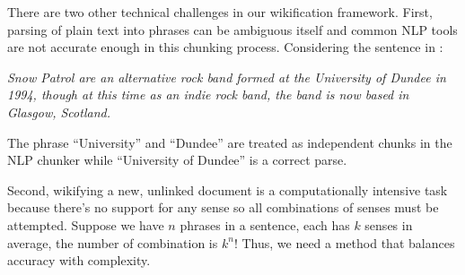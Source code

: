 There are two other technical challenges in our wikification framework.
First, parsing of plain text into phrases can be ambiguous itself and
common NLP tools are not accurate enough in this chunking process.
Considering the sentence in :
\begin{example}
\label{ex-rim}
{\em \textit{Snow Patrol are an alternative rock band formed
at the University of Dundee in 1994, though at this time as an indie
rock band, the band is now based in Glasgow, Scotland.}}
\end{example}
The phrase ``University'' and ``Dundee'' are treated as independent chunks in
the NLP chunker while ``University of Dundee'' is a correct parse.

Second, wikifying a new, unlinked document is
a computationally intensive task because there's no support for
any sense so all combinations of senses must be attempted.
Suppose we have $n$ phrases in a sentence, each has $k$ senses in average,
the number of combination is $k^n$!
Thus, we need a method that balances accuracy with complexity.


